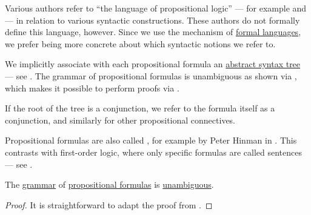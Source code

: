 \begin{comments}
  \item Various authors refer to \enquote{the language of propositional logic} --- for example  and  --- in relation to various syntactic constructions. These authors do not formally define this language, however. Since we use the mechanism of \hyperref[def:formal_language]{formal languages}, we prefer being more concrete about which syntactic notions we refer to.

  \item We implicitly associate with each propositional formula an \hyperref[con:abstract_syntax_tree]{abstract syntax tree} --- see . The grammar of propositional formulas is unambiguous as shown via , which makes it possible to perform proofs via .

  \item If the root of the tree is a conjunction, we refer to the formula itself as a conjunction, and similarly for other propositional connectives.

  \item Propositional formulas are also called , for example by Peter Hinman in . This contrasts with first-order logic, where only specific formulas are called sentences --- see .
\end{comments}

\begin{proposition}\label{thm:propositional_formulas_are_unambiguous}
  The \hyperref[def:formal_grammar]{grammar} of \hyperref[def:propositional_grammar_schema/formula]{propositional formulas} is \hyperref[def:grammar_ambiguity]{unambiguous}.
\end{proposition}
\begin{proof}
  It is straightforward to adapt the proof from .
\end{proof}

